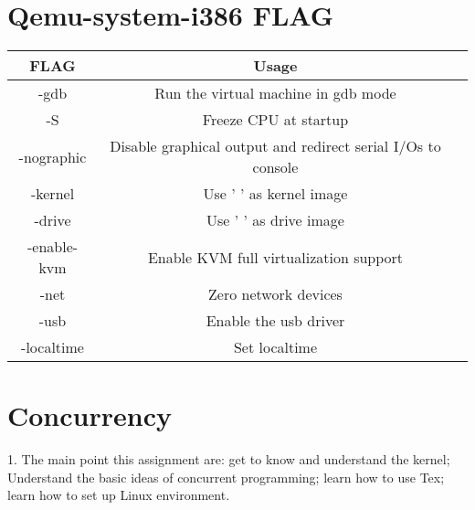 \documentclass[letterpaper,10pt]{article}
\begin{document}
\section{Qemu-system-i386 FLAG}
\begin{tabular}{@{}ccc@{}}
    \toprule
    FLAG        & Usage                                                          \\ \midrule
    -gdb        & Run the virtual machine in gdb mode                            \\
    -S          & Freeze CPU at startup                                          \\
    -nographic  & Disable graphical output and redirect serial I/Os to console   \\
    -kernel     & Use ' ' as kernel image                                        \\
    -drive      & Use ' ' as drive image                                         \\
    -enable-kvm & Enable KVM full virtualization support                         \\
    -net        & Zero network devices                                           \\
    -usb        & Enable the usb driver                                          \\
    -localtime  & Set localtime                                                  \\ \bottomrule
\end{tabular}


\section{Concurrency}
1. 
The main point this assignment are: get to know and understand the kernel; Understand the basic ideas of concurrent programming; learn how to use Tex; learn how to set up Linux environment. 
\end{document}
